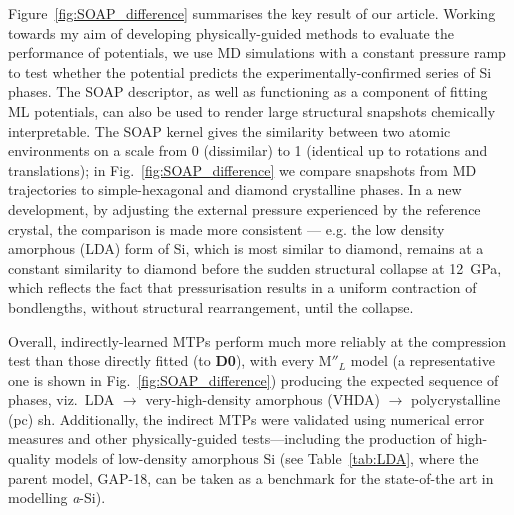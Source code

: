 \documentclass[12pt,a4paper,twoside,nobind]{ociamthesis}
\newcommand{\ind}[1]{\mathrm{#1''\!\!}}
\begin{document}
Figure\ \ref{fig:SOAP_difference} summarises the key result of our article.\autocite{Morrow2022} Working towards my aim of developing physically-guided methods to evaluate the performance of potentials,
we use MD simulations with a constant pressure ramp to test whether the potential predicts the experimentally-confirmed series of Si phases.
The SOAP descriptor, as well as functioning as a component of fitting ML potentials, can also be used to render large structural snapshots chemically interpretable.
The SOAP kernel gives the similarity between two atomic environments on a scale from 0 (dissimilar) to 1 (identical up to rotations and translations); in Fig.\ \ref{fig:SOAP_difference} we compare snapshots
from MD trajectories to simple-hexagonal and diamond crystalline phases. In a new development, by adjusting the external pressure experienced by the reference crystal, the comparison is made more
consistent --- e.g. the low density amorphous (LDA) form of Si, which is most similar to diamond, remains at a constant similarity to diamond before the sudden structural collapse at \SI{12}{GPa}, 
which reflects the fact that pressurisation results in a uniform contraction of bondlengths, without structural rearrangement, until the collapse.

Overall, indirectly-learned MTPs perform much more reliably at the compression test than those directly fitted (to \textbf{D0}), 
with every $\ind{M}_{L}$ model (a representative one is shown in Fig.\ \ref{fig:SOAP_difference})
producing the expected sequence of phases, viz.\ LDA $\longrightarrow$ very-high-density amorphous (VHDA) $\longrightarrow$ polycrystalline (pc) sh.\autocite{Deringer2021}
Additionally, the indirect MTPs were validated using numerical error measures and other physically-guided tests---including the production of high-quality models of low-density amorphous Si
(see Table\ \ref{tab:LDA}, where the parent model, GAP-18, can be taken as a benchmark for the state-of-the art in modelling \emph{a}-Si).
\end{document}
